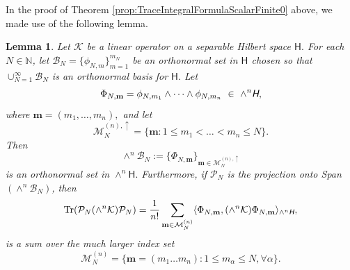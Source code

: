 \documentclass{birkjour}
\newtheorem{lem}[thm]{Lemma}
\theoremstyle{definition}
\theoremstyle{remark}
\numberwithin{equation}{section}
\newcommand{\sH}{{\mathsf H}}
\begin{document}
In the proof of Theorem \ref{prop:TraceIntegralFormulaScalarFinite0} above, we made use of the following lemma.

\begin{lem}\label{lemmatracesum}
Let $\mathcal{K}$ be a linear operator on a separable Hilbert space $\sH.$ For each  $N \in \mathbb{N}$, let $\mathcal{B}_N = \{\phi_{N,m}\}_{m=1}^{m_N}$ 
be an orthonormal set in $\sH$ chosen so that $\cup_{N=1}^{\infty} \mathcal{B}_N$ is an orthonormal basis for $\sH.$
Let 
\begin{equation}
    \Phi_{N,\mathbf{m}} = \phi_{N,m_1} \wedge \dots \wedge \phi_{N,m_n} \,\, \in \,\, \wedge^n\emph{\textsf H},
\end{equation}
where $\mathbf{m} = (m_1, \dots, m_n),$ and let
\begin{equation}
\mathcal{M}_N^{(n),\uparrow} = \{\mathbf{m} : 1 \leq m_1 < \dots < m_n \leq N\}.
\end{equation}
Then \begin{equation}
    {\wedge}^n \mathcal{B}_N := \{\Phi_{N,\mathbf{m}}\}_{\mathbf{m} \in \mathcal{M}_N^{(n), \uparrow}}
\end{equation}
is an orthonormal set in ${\wedge}^n \sH. $ 
Furthermore, if $\mathcal{P}_N$ is the projection onto \emph{Span}$(\wedge^n \mathcal{B}_N)$, then 
\begin{equation}\label{trPN}
    \operatorname{Tr}(\mathcal{P}_N ({\wedge}^n \mathcal{K}) \mathcal{P}_N) =  \frac{1}{n!} \sum_{\mathbf{m} \in \mathcal{M}^{(n)}_N} \langle \Phi_{N, \mathbf{m}}, ({\wedge}^n \mathcal{K}) \Phi_{N, \mathbf{m}} \rangle_{\wedge^n\emph{\textsf H}},
\end{equation}
is a sum over the much larger index set 
\begin{equation}
    \mathcal{M}_N^{(n)} = \{ \mathbf{m} = (m_1 \dots m_n) : 1 \leq m_{\alpha} \leq N, \forall \alpha \}.
\end{equation}
\end{lem}
\end{document}
